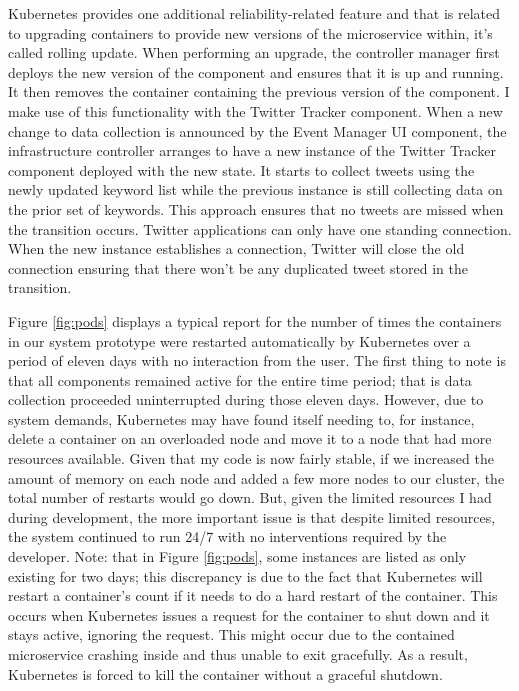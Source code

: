 Kubernetes provides one additional reliability-related feature and that is related to upgrading containers to provide new versions of the microservice within, it’s called rolling update. When performing an upgrade, the controller manager first deploys the new version of the component and ensures that it is up and running. It then removes the container containing the previous version of the component. I make use of this functionality with the Twitter Tracker component. When a new change to data collection is announced by the Event Manager UI component, the infrastructure controller arranges to have a new instance of the Twitter Tracker component deployed with the new state. It starts to collect tweets using the newly updated keyword list while the previous instance is still collecting data on the prior set of keywords. This approach ensures that no tweets are missed when the transition occurs. Twitter applications can only have one standing connection. When the new instance establishes a connection, Twitter will close the old connection ensuring that there won’t be any duplicated tweet stored in the transition.

Figure \ref{fig:pods} displays a typical report for the number of times the containers in our system prototype were restarted automatically by Kubernetes over a period of eleven days with no interaction from the user. The first thing to note is that all components remained active for the entire time period; that is data collection proceeded uninterrupted during those eleven days. However, due to system demands, Kubernetes may have found itself needing to, for instance, delete a container on an overloaded node and move it to a node that had more resources available. Given that my code is now fairly stable, if we increased the amount of memory on each node and added a few more nodes to our cluster, the total number of restarts would go down. But, given the limited resources I had during development, the more important issue is that despite limited resources, the system continued to run 24/7 with no interventions required by the developer.  Note: that in Figure \ref{fig:pods}, some instances are listed as only existing for two days; this discrepancy is due to the fact that Kubernetes will restart a container’s count if it needs to do a hard restart of the container. This occurs when Kubernetes issues a request for the container to shut down and it stays active, ignoring the request. This might occur due to the contained microservice crashing inside and thus unable to exit gracefully. As a result, Kubernetes is forced to kill the container without a graceful shutdown.



